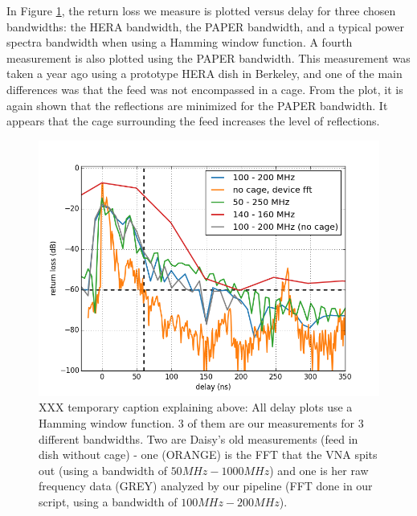 \documentclass[12pt,preprint]{aastex}
\begin{document}
In Figure \ref{fig:3bands}, the return loss we measure is plotted versus delay for three
chosen bandwidths: the HERA bandwidth, the PAPER bandwidth, and a typical power
spectra bandwidth when using a Hamming window function. A fourth measurement is also plotted using the PAPER bandwidth. This measurement was taken a year ago using a prototype HERA dish in Berkeley, and one of the main differences was that the feed was not encompassed in a cage. From the plot, it is again
shown that the reflections are minimized for the PAPER bandwidth. It appears that the cage surrounding the feed increases the level of reflections.

\begin{figure}
\centering
\includegraphics[totalheight=0.4\textheight]{plots/delay3_window.png}
\caption{XXX temporary caption explaining above: All delay plots use a Hamming window function. 3 of them are our measurements for 3 different bandwidths. Two are Daisy's old measurements (feed in dish without cage) - one (ORANGE) is the FFT that the VNA spits out (using a bandwidth of $50MHz-1000MHz$) and one is her raw frequency data (GREY) analyzed by our pipeline (FFT done in our script, using a bandwidth of $100MHz-200MHz$).}
\label{fig:3bands}
\end{figure}
\end{document}
